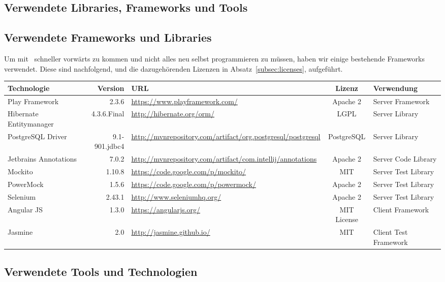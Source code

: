 \begin{landscape}
	\section{Verwendete Libraries, Frameworks und Tools}

	\subsection{Verwendete Frameworks und Libraries}		
	Um mit \eeppi\ schneller vorwärts zu kommen und nicht alles neu selbst programmieren zu müssen,
	haben wir einige bestehende Frameworks verwendet.
	Diese sind nachfolgend, und die dazugehörenden Lizenzen in Absatz\ \ref{subsec:licenses}, aufgeführt.
	
	
	\vspace{0.5cm}
	
	\newcommand{\addLib}[5]{
		#1 & #2 & \url{#3} & #4 & #5 \\ \hline
	}
	
	
	\begin{tabularx}{\linewidth}{| l r | X | c | l |}
		\hline
		\textbf{Technologie} & \textbf{Version} & \textbf{URL} & \textbf{Lizenz} & \textbf{Verwendung} \\
		\hline \hline
		\addLib{Play Framework}{2.3.6}{https://www.playframework.com/}{Apache 2}{Server Framework}
		\addLib{Hibernate Entitymanager}{4.3.6.Final}{http://hibernate.org/orm/}{LGPL}{Server Library}
		\addLib{PostgreSQL Driver}{9.1-901.jdbc4}{http://mvnrepository.com/artifact/org.postgresql/postgresql}{PostgreSQL}{Server Library}
		\addLib{Jetbrains Annotations}{7.0.2}{http://mvnrepository.com/artifact/com.intellij/annotations}{Apache 2}{Server Code Library}
		\addLib{Mockito}{1.10.8}{https://code.google.com/p/mockito/}{MIT}{Server Test Library}
		\addLib{PowerMock}{1.5.6}{https://code.google.com/p/powermock/}{Apache 2}{Server Test Library}
		\addLib{Selenium}{2.43.1}{http://www.seleniumhq.org/}{Apache 2}{Server Test Library}
		\addLib{Angular JS}{1.3.0}{https://angularjs.org/}{MIT License}{Client Framework}
		\addLib{Jasmine}{2.0}{http://jasmine.github.io/}{MIT}{Client Test Framework}
	\end{tabularx}
\end{landscape}

		\subsection{Verwendete Tools und Technologien}
		
